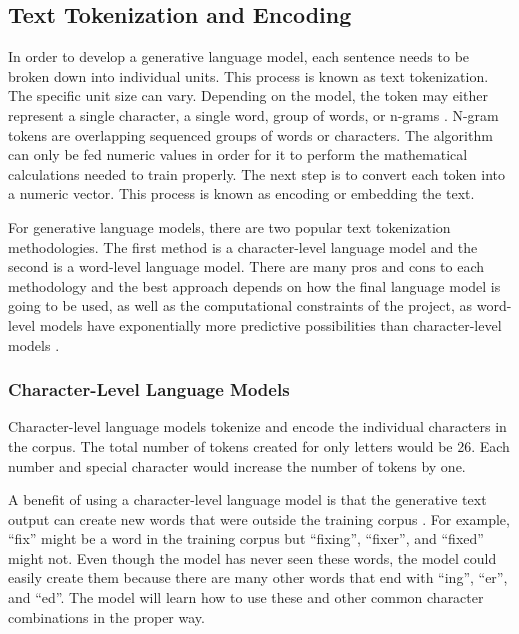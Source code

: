 \documentclass[5p,authoryear]{elsarticle}
\begin{document}
\subsection{Text Tokenization and Encoding}\label{token}

In order to develop a generative language model, each sentence needs to be broken down into individual units. This process is known as text tokenization. The specific unit size can vary. Depending on the model, the token may either represent a single character, a single word, group of words, or n-grams \citep{chollet}. N-gram tokens are overlapping sequenced groups of words or characters. The algorithm can only be fed numeric values in order for it to perform the mathematical calculations needed to train properly. The next step is to convert each token into a numeric vector. This process is known as encoding or embedding the text. 

For generative language models, there are two popular text tokenization methodologies. The first method is a character-level language model and the second is a word-level language model. There are many pros and cons to each methodology and the best approach depends on how the final language model is going to be used, as well as the computational constraints of the project, as word-level models have exponentially more predictive possibilities than character-level models \citep{foster}.


\subsubsection{Character-Level Language Models}\label{char}

Character-level language models tokenize and encode the individual characters in the corpus. The total number of tokens created for only letters would be 26. Each number and special character would increase the number of tokens by one.

A benefit of using a character-level language model is that the generative text output can create new words that were outside the training corpus \citep{lane}. For example, “fix” might be a word in the training corpus but “fixing”, “fixer”, and “fixed” might not. Even though the model has never seen these words, the model could easily create them because there are many other words that end with “ing”, “er”, and “ed”. The model will learn how to use these and other common character combinations in the proper way. 
\end{document}
